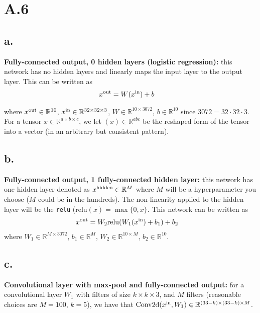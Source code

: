 \documentclass{article}
\newcommand{\field}[1]{\mathbb{#1}}
\newcommand{\1}{\mathbf{1}}
\newcommand{\R}{\field{R}} %
\begin{document}
\section*{A.6}
{\Large 


\subsection*{a.}

\textbf{Fully-connected output, 0 hidden layers (logistic regression):} this network has no hidden layers and linearly maps the input layer to the output layer. This can be written as 
  \begin{align*}
    x^{\rm out} &= W (x^{\rm in}) +b
  \end{align*} 
  
  where $x^{\rm out} \in \R^{10}$, $x^{\rm in} \in \R^{32 \times 32 \times 3}$, $W \in \R^{10 \times 3072}$, $b \in \R^{10}$ since $3072 = 32 \cdot 32 \cdot 3$. For a tensor $x \in \R^{a \times b \times c}$, we let $(x) \in \R^{a b c}$ be the reshaped form of the tensor into a vector (in an arbitrary but consistent pattern).

\subsection*{b.}

\textbf{Fully-connected output, 1 fully-connected hidden layer:} this network has one hidden layer denoted as $x^{\rm hidden} \in \R^{M}$ where $M$ will be a hyperparameter you choose ($M$ could be in the hundreds). The non-linearity applied to the hidden layer will be the \texttt{relu} ($\mathrm{relu}(x) = \max\{0,x\}$. This network can be written as
  \begin{align*}
    x^{\rm out} &= W_2 \mathrm{relu}(W_1 (x^{\rm in}) +b_1) + b_2
  \end{align*}
  where $W_1 \in \R^{M \times 3072}$, $b_1 \in \R^M$, $W_2 \in \R^{10 \times M}$, $b_2 \in \R^{10}$.

\subsection*{c.}

\textbf{Convolutional layer with max-pool and fully-connected output:} for a convolutional layer $W_1$ with filters of size $k \times k \times 3$, and $M$ filters (reasonable choices are $M=100$, $k=5$), we have that $\mathrm{Conv2d}(x^{\rm in}, W_1) \in \R^{(33-k) \times (33-k) \times M}$.
  
}
\end{document}
